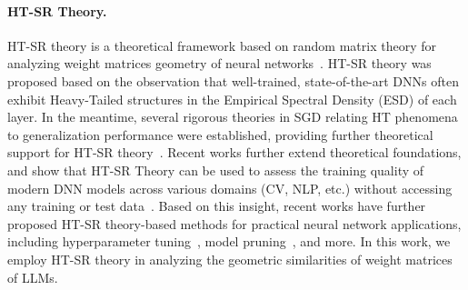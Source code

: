 \noindent\paragraph{HT-SR Theory.} HT-SR theory is a theoretical framework based on random matrix theory for analyzing weight matrices geometry of neural networks~\citep{mahoney2019traditional, martin2021implicit, couillet2022random, liao2025random}. HT-SR theory was proposed
based on the observation that well-trained, state-of-the-art DNNs often exhibit Heavy-Tailed structures in the Empirical Spectral Density (ESD)
of each layer. In the meantime, several rigorous theories in SGD relating HT phenomena to generalization
performance were established, providing further theoretical support for HT-SR theory~\citep{gurbuzbalaban2021heavy, hodgkinson2021multiplicative, hodgkinson2022generalization, simsekli2019tail, simsekli2020hausdorff}. Recent works further extend theoretical foundations, and show that HT-SR Theory can be used to assess the training quality of modern DNN models across various domains (CV, NLP, etc.) without accessing any training or test data~\citep{yang2023test, martin2021implicit}. Based on this insight, recent works have further proposed HT-SR theory-based methods for practical neural network applications, including hyperparameter tuning~\citep{zhou2023temperature, liu-etal-2024-model, hu2025eigenspectrum}, model pruning~\citep{lu2024alphapruning,hu2025eigenspectrum}, and more. In this work, we employ HT-SR theory in analyzing the geometric similarities of weight matrices of LLMs.


